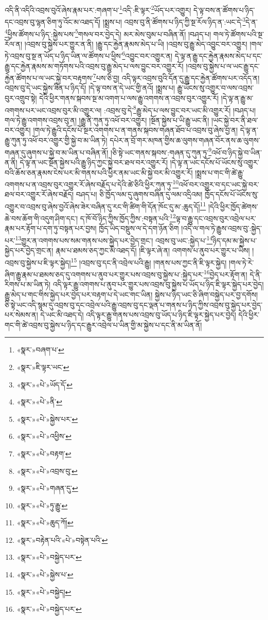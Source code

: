 འདི་ནི་འདིའི་འབྲས་བུའོ་ཞེས་རྣམ་པར་:གཞག་པ་\footnote{«སྣར་»བཞག་པ་}འདི་:ཇི་ལྟར་\footnote{«སྣར་»ཇི་ལྟར་ཡང་}ཡོད་པར་འགྱུར། དེ་ལྟ་བས་ན་ཚོགས་པ་ཉིད་དང་འབྲས་བུ་ལྷན་ཅིག་ཏུ་འོང་མ་འཐད་དོ། །སྨྲས་པ། འབྲས་བུ་ནི་ཚོགས་པ་ཉིད་ཀྱི་སྔ་རོལ་ཉིད་ན་:ཡང་དེ་\footnote{«སྣར་»«པེ་»ཡོད་དོ་}དེ་ན་\footnote{«སྣར་»«པེ་»ནི་}ཕྱིས་ཚོགས་པ་ཉིད་:སྐྱེས་པས་\footnote{«སྣར་»«པེ་»སྐྱེས་པར་}གསལ་བར་བྱེད་དེ། མར་མེས་བུམ་པ་བཞིན་ནོ། །བཤད་པ། གལ་ཏེ་ཚོགས་པའི་སྔ་རོལ་ན། །འབྲས་བུ་སྐྱེས་པར་གྱུར་ན་ནི། །རྒྱུ་དང་རྐྱེན་རྣམས་མེད་པ་ཡི། །འབྲས་བུ་རྒྱུ་མེད་འབྱུང་བར་འགྱུར། །གལ་ཏེ་འབྲས་བུ་སྔ་ན་ཡོད་པ་ཉིད་ཡིན་ལ་ཚོགས་པ་ཕྱིས་\footnote{«སྣར་»«པེ་»འཕྱིས་}འབྱུང་བར་འགྱུར་ན། དེ་ལྟ་ན་རྒྱུ་དང་རྐྱེན་རྣམས་མེད་པ་དང་རྒྱུ་དང་རྐྱེན་རྣམས་མ་གཏོགས་པའི་འབྲས་བུ་རྒྱུ་མེད་པ་ལས་བྱུང་བར་འགྱུར་རོ། །འབྲས་བུ་སྐྱེས་པ་ལ་ཡང་རྒྱུ་དང་རྐྱེན་ཚོགས་པ་ལ་ཡང་སྐྱེ་བར་བརྟགས་\footnote{«སྣར་»«པེ་»བརྟག་}པས་ཅི་བྱ། འདི་ལྟར་འབྲས་བུའི་དོན་དུ་རྒྱུ་དང་རྐྱེན་ཚོགས་པར་འདོད་ན། འབྲས་བུ་དེ་ཡང་སྐྱེས་ཟིན་པ་ཉིད་དོ། །དེ་ལྟ་བས་ན་དེ་ཡང་གྱི་ནའོ། །སྨྲས་པ། རྒྱུ་ཡོངས་སུ་འགྱུར་བ་ལས་འབྲས་བུར་འགྲུབ་སྟེ། དེའི་ཕྱིར་གནས་སྐབས་སྔ་མ་འགག་པ་ལས་རྒྱུ་འགགས་ན་འབྲས་བུར་འགྱུར་རོ། །དེ་ལྟ་ན་རྒྱུ་མ་འགགས་པར་ཡང་འབྲས་བུར་མི་འགྱུར་ལ། :འབྲས་བུ་དེ་\footnote{«སྣར་»«པེ་»འབྲས་བུ་}རྒྱུ་མེད་པ་ལས་བྱུང་བར་ཡང་མི་འགྱུར་རོ། །བཤད་པ། གལ་ཏེ་རྒྱུ་འགགས་འབྲས་བུ་ན། །རྒྱུ་ནི་ཀུན་ཏུ་འཕོ་བར་འགྱུར། །སྔོན་སྐྱེས་པ་ཡི་རྒྱུ་ཡང་ནི། །ཡང་སྐྱེ་བར་ནི་ཐལ་བར་འགྱུར། །གལ་ཏེ་རྒྱུའི་དངོས་པོ་སྔར་འགགས་པ་ན་གནས་སྐབས་གཞན་ཐོབ་པ་འབྲས་བུ་ཞེས་བྱ་ན། དེ་ལྟ་ན་རྒྱུ་ཀུན་ཏུ་འཕོ་བར་འགྱུར་གྱི་སྐྱེ་བ་མ་ཡིན་ཏེ། དཔེར་ན་བྲོ་གར་མཁན་གྱིས་ཆ་ལུགས་གཞན་བོར་ནས་ཆ་ལུགས་གཞན་དུ་ཞུགས་པ་སྐྱེ་བ་མ་ཡིན་པ་བཞིན་ནོ། །ཅི་སྟེ་ཡང་གནས་སྐབས་:གཞན་དུ་ཀུན་ཏུ་\footnote{«སྣར་»«པེ་»གཞན་དུ་}འཕོ་བ་ཉིད་སྐྱེ་བ་ཡིན་ན་ནི། དེ་ལྟ་ན་ཡང་སྔོན་སྐྱེས་པའི་རྒྱུ་ཉིད་ཀྱང་སྐྱེ་བར་ཐལ་བར་འགྱུར་རོ། །དེ་ལྟ་ན་ཡང་དངོས་པོ་ཡོངས་སུ་འགྱུར་བའི་ཆོས་ཅན་རྣམས་ངེས་པར་མི་གནས་པའི་ཕྱིར་ནམ་ཡང་མི་སྐྱེ་བར་མི་འགྱུར་རོ། །སྨྲས་པ་གང་གི་ཚེ་རྒྱུ་འགགས་པ་ན་འབྲས་བུར་འགྱུར་རོ་ཞེས་བརྗོད་པ་དེའི་ཚེ་ཅིའི་ཕྱིར་ཀུན་ཏུ་\footnote{«སྣར་»«པེ་»ཏུ་རྒྱུ་}འཕོ་བར་འགྱུར་བ་དང་ཡང་སྐྱེ་བར་ཐལ་བར་འགྱུར་རོ་ཞེས་བརྗོད། བཤད་པ། ཅི་ཁྱོད་ལམ་དུ་ཞུགས་བཞིན་དུ་ལམ་འདྲིའམ། ཁྱོད་དངོས་པོ་ཡོངས་སུ་འགྱུར་བ་འབྲས་བུ་ཞེས་བྱའོ་ཞེས་ཟེར་བཞིན་དུ་རང་གི་ཚིག་གི་དོན་ཁོང་དུ་མ་:ཆུད་དོ།\footnote{«སྣར་»«པེ་»ཆུད་ཀོ།} །དེའི་ཕྱིར་ཁྱོད་ཚེགས་ཆེ་བས་ཆོག་གི་འདུག་ཤིག་དང་། ད་ཁོ་བོ་ཉིད་ཀྱིས་ཁྱོད་ཀྱིས་:བསྟན་པའི་\footnote{«སྣར་»བརྟེན་པའི་«པེ་»བསྟེན་པའི་}ལྟ་བ་རྒྱུ་དང་འབྲས་བུར་འབྲེལ་པར་རྣམ་པར་རྟོག་པ་དག་ཏུ་བསྟན་པར་བྱས། ཁྱོད་ཡིད་བསྡུས་ལ་དེ་དག་ཉོན་ཅིག །འདི་ལ་གལ་ཏེ་རྒྱུས་འབྲས་བུ་:སྐྱེད་པར་\footnote{«སྣར་»«པེ་»བསྐྱེད་པར་}གྱུར་ན་འགགས་པས་སམ་གནས་པས་སྐྱེད་པར་བྱེད་གྲང་། འབྲས་བུ་ཡང་:སྐྱེད་པ་\footnote{«སྣར་»«པེ་»སྐྱེས་པ་}ཉིད་དམ་མ་སྐྱེས་པ་སྐྱེད་པར་བྱེད་གྲང་ན། རྣམ་པ་ཐམས་ཅད་ཀྱང་མི་འཐད་དོ། །ཇི་ལྟར་ཞེ་ན། འགགས་པ་ནུབ་པར་གྱུར་པ་ཡིས། །འབྲས་བུ་སྐྱེས་པ་ཇི་ལྟར་སྐྱེད།\footnote{«སྣར་»«པེ་»བསྐྱེད།} །འབྲས་བུ་དང་ནི་འབྲེལ་པའི་རྒྱུ། །གནས་པས་ཀྱང་ནི་ཇི་ལྟར་སྐྱེད། །གལ་ཏེ་རེ་ཞིག་རྒྱུ་རྣམ་པ་ཐམས་ཅད་དུ་འགགས་པ་ནུབ་པར་གྱུར་པས་འབྲས་བུ་སྐྱེས་པ་:སྐྱེད་པར་\footnote{«སྣར་»«པེ་»བསྐྱེད་པར་}བྱེད་པར་རྟོག་ན། དེ་ནི་རིགས་པ་མ་ཡིན་ཏེ། འདི་ལྟར་རྒྱུ་འགགས་པ་ནུབ་པར་གྱུར་པས་འབྲས་བུ་སྐྱེས་པ་ཡོད་པ་ཉིད་ཇི་ལྟར་སྐྱེད་པར་བྱེད། རྒྱུ་མེད་པ་གང་གིས་སྐྱེད་པར་བྱེད་པར་བརྟག་པ་དེ་ཡང་གང་ཡིན། སྐྱེས་པ་ཉིད་ཡང་ཅི་ཞིག་བསྐྱེད་པར་བྱ་དགོས། ཅི་སྟེ་ཡང་འདི་སྙམ་དུ་འབྲས་བུ་དང་འབྲེལ་པའི་རྒྱུ་འབྲས་བུ་དང་ལྡན་པ་གནས་པ་ཉིད་ཀྱིས་འབྲས་བུ་སྐྱེད་པར་བྱེད་པར་སེམས་ན། དེ་ཡང་མི་འཐད་དེ། འདི་ལྟར་རྒྱུ་གནས་པས་འབྲས་བུ་ཡོད་པ་ཉིད་ཇི་ལྟར་སྐྱེད་པར་བྱེད། དེའི་ཕྱིར་གང་གི་ཚེ་འབྲས་བུ་སྐྱེས་པ་ཉིད་དང་རྒྱུར་འབྲེལ་པ་ཡིན་གྱི་མ་སྐྱེས་པ་དང་ནི་མ་ཡིན་ནོ། 